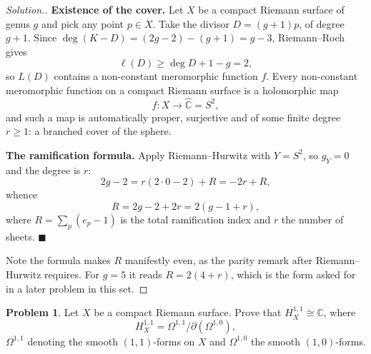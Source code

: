 \documentclass[11pt,a4paper]{article}
\theoremstyle{definition}
\newtheorem{problemx}{Problem}[section]
\newenvironment{problem}{\begin{problemx}}{\end{problemx}}
\newenvironment{solution}
  {\renewcommand{\qedsymbol}{}\begin{proof}[\textit{Solution}.]}
  {\end{proof}}
\begin{document}
\begin{solution}
\textbf{Existence of the cover.} Let $X$ be a compact Riemann surface of genus $g$
and pick any point $p \in X$. Take the divisor $D = (g+1)p$, of degree $g+1$. Since
$\deg(K - D) = (2g-2) - (g+1) = g - 3$, Riemann--Roch gives
$$\ell(D) \geq \deg D + 1 - g = 2 ,$$
so $L(D)$ contains a non-constant meromorphic function $f$. Every non-constant
meromorphic function on a compact Riemann surface is a holomorphic map
$$f : X \longrightarrow \widehat{\mathbb{C}} = S^{2},$$
and such a map is automatically proper, surjective and of some finite degree
$r \geq 1$: a branched cover of the sphere.

\textbf{The ramification formula.} Apply Riemann--Hurwitz with $Y = S^{2}$, so
$g_Y = 0$ and the degree is $r$:
$$2g - 2 = r(2\cdot 0 - 2) + R = -2r + R ,$$
whence
$$\boxed{R = 2g - 2 + 2r = 2\left(g - 1 + r\right),}$$
where $R = \sum_{p}(e_p-1)$ is the total ramification index and $r$ the number of
sheets. $\blacksquare$

Note the formula makes $R$ manifestly even, as the parity remark after
Riemann--Hurwitz requires. For $g = 5$ it reads $R = 2(4+r)$, which is the form
asked for in a later problem in this set.
\end{solution}


\begin{problem}
Let $X$ be a compact Riemann surface. Prove that
$H^{1,1}_{X} \cong \mathbb{C}$, where
$$H^{1,1}_{X} = \Omega^{1,1}/\partial\!\left(\Omega^{1,0}\right),$$
$\Omega^{1,1}$ denoting the smooth $(1,1)$-forms on $X$ and $\Omega^{1,0}$ the
smooth $(1,0)$-forms.
\end{problem}
\end{document}
